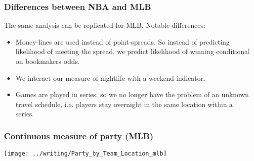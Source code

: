 \documentclass{beamer}
\begin{document}
\begin{frame}   \frametitle{Differences between NBA and MLB}
  The same analysis can be replicated for MLB. Notable differences:
  \vspace{12pt}  
  \begin{itemize}     
    \item Money-lines are used instead of point-spreads. 
      So instead of predicting likelihood of meeting the spread,
      we predict likelihood of winning conditional on bookmakers odds.
    \item We interact our measure of nightlife with a weekend indicator.
    \item Games are played in series, so we no longer have the problem of an unknown travel schedule, i.e. players stay overnight in the same location within a series.   \end{itemize} \end{frame}

\begin{frame}   
  \frametitle{Continuous measure of party (MLB)}
  \centering \texttt{[image: ../writing/Party\_by\_Team\_Location\_mlb]}   
\end{frame}
\end{document}
